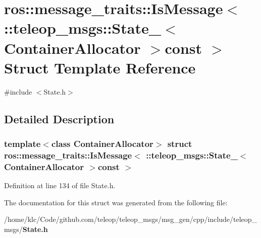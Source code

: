 \section{ros::message\_\-traits::IsMessage$<$ ::teleop\_\-msgs::State\_\-$<$ ContainerAllocator $>$const $>$ Struct Template Reference}
\label{structros_1_1message__traits_1_1IsMessage_3_01_1_1teleop__msgs_1_1State___3_01ContainerAllocator_01_4const_01_01_4}


{\ttfamily \#include $<$State.h$>$}



\subsection{Detailed Description}
\subsubsection*{template$<$class ContainerAllocator$>$ struct ros::message\_\-traits::IsMessage$<$ ::teleop\_\-msgs::State\_\-$<$ ContainerAllocator $>$const  $>$}



Definition at line 134 of file State.h.



The documentation for this struct was generated from the following file:\begin{DoxyCompactItemize}
\item 
/home/klc/Code/github.com/teleop/teleop\_\-msgs/msg\_\-gen/cpp/include/teleop\_\-msgs/{\bf State.h}\end{DoxyCompactItemize}
